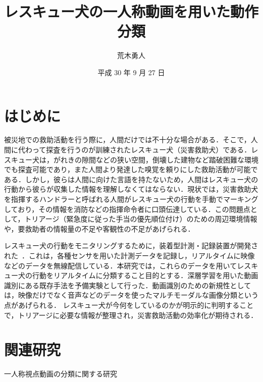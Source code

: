 \documentclass[twocolumn, a4paper]{UECIEresume}
\title{レスキュー犬の一人称動画を用いた動作分類}
\date{平成 30 年 9 月 27 日}
\affiliation{総合情報学科 メディア情報学コース}
\author{荒木勇人}
\begin{document}
\maketitle

\section{はじめに}
被災地での救助活動を行う際に，人間だけでは不十分な場合がある．そこで，人間に代わって探査を行うのが訓練されたレスキュー犬（災害救助犬）である．レスキュー犬は，がれきの隙間などの狭い空間，倒壊した建物など踏破困難な環境でも探査可能であり，また人間より発達した嗅覚を頼りにした救助活動が可能である．しかし，彼らは人間に向けた言語を持たないため，人間はレスキュー犬の行動から彼らが収集した情報を理解しなくてはならない．現状では，災害救助犬を指揮するハンドラーと呼ばれる人間がレスキュー犬の行動を手動でマーキングしており，その情報を消防などの指揮命令者に口頭伝達している．この問題点として，トリアージ（緊急度に従った手当の優先順位付け）のための周辺環境情報や，要救助者の情報量の不足や客観性の不足があげられる．

レスキュー犬の行動をモニタリングするために，装着型計測・記録装置が開発された~\cite{dog01}．これは，各種センサを用いた計測データを記録し，リアルタイムに映像などのデータを無線配信している．本研究では，これらのデータを用いてレスキュー犬の行動をリアルタイムに分類すること目的とする．深層学習を用いた動画識別にある既存手法を予備実験として行った．動画識別のための新規性としては，映像だけでなく音声などのデータを使ったマルチモーダルな画像分類という点があげられる．
レスキュー犬が今何をしているのかが明示的に判明することで，トリアージに必要な情報が整理され，災害救助活動の効率化が期待される．

\section{関連研究}
一人称視点動画の分類に関する研究
\end{document}
